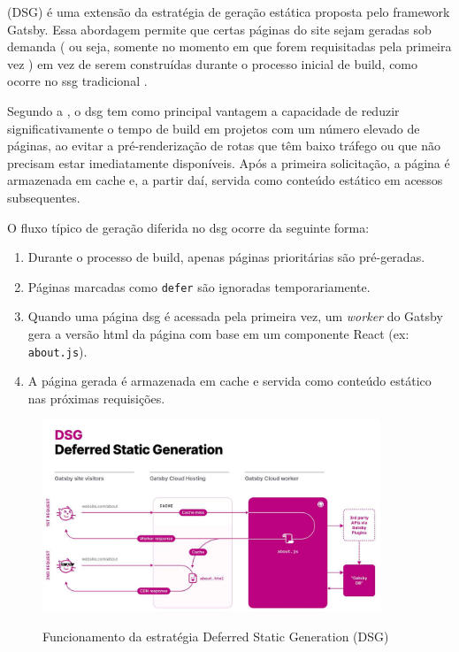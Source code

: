  (DSG) é uma extensão da estratégia de geração estática proposta pelo framework Gatsby. Essa abordagem permite que certas páginas do site sejam geradas sob demanda ( ou seja, somente no momento em que forem requisitadas pela primeira vez ) em vez de serem construídas durante o processo inicial de build, como ocorre no \acrshort{ssg} tradicional \cite{gatsby2023}.

Segundo a , o \acrshort{dsg} tem como principal vantagem a capacidade de reduzir significativamente o tempo de build em projetos com um número elevado de páginas, ao evitar a pré-renderização de rotas que têm baixo tráfego ou que não precisam estar imediatamente disponíveis. Após a primeira solicitação, a página é armazenada em cache e, a partir daí, servida como conteúdo estático em acessos subsequentes.

O fluxo típico de geração diferida no \acrshort{dsg} ocorre da seguinte forma:

\begin{enumerate}
    \item Durante o processo de build, apenas páginas prioritárias são pré-geradas.
    \item Páginas marcadas como \texttt{defer} são ignoradas temporariamente.
    \item Quando uma página \acrshort{dsg} é acessada pela primeira vez, um \textit{worker} do Gatsby gera a versão \acrshort{html} da página com base em um componente React (ex: \texttt{about.js}).
    \item A página gerada é armazenada em cache e servida como conteúdo estático nas próximas requisições.
\end{enumerate}

\begin{figure}[H]
  \centering
  \caption{Funcionamento da estratégia Deferred Static Generation (DSG)}
  \includegraphics[width=0.9\textwidth]{media/deferred_static_generation_dsg.png}
  \label{fig:deferred_dsg}
\end{figure}

